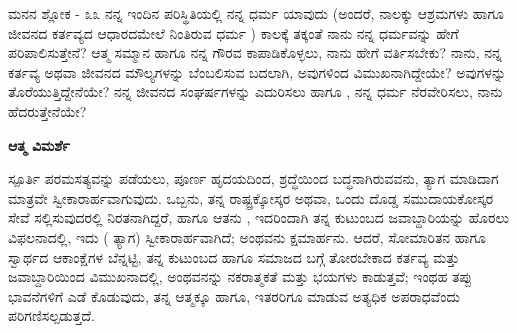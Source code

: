 \begin{mananam}{\mananamfont ಮನನ ಶ್ಲೋಕ - ೩೩}
\footnotesize \mananamtext ನನ್ನ ಇಂದಿನ ಪರಿಸ್ಥಿತಿಯಲ್ಲಿ ನನ್ನ ಧರ್ಮ ಯಾವುದು (ಅಂದರೆ, ನಾಲಕ್ಕು ಆಶ್ರಮಗಳು ಹಾಗೂ ಜೀವನದ ಕರ್ತವ್ಯದ ಆಧಾರದಮೇಲೆ ನಿಂತಿರುವ ಧರ್ಮ ) ಕಾಲಕ್ಕೆ ತಕ್ಕಂತೆ ನಾನು ನನ್ನ ಧರ್ಮವನ್ನು ಹೇಗೆ ಪರಿಪಾಲಿಸುತ್ತೇನೆ? ಆತ್ಮ ಸಮ್ಮಾನ ಹಾಗೂ ನನ್ನ ಗೌರವ ಕಾಪಾಡಿಕೊಳ್ಳಲು, ನಾನು ಹೇಗೆ ವರ್ತಿಸಬೇಕು? ನಾನು, ನನ್ನ ಕರ್ತವ್ಯ ಅಥವಾ ಜೀವನದ ಮೌಲ್ಯಗಳನ್ನು ಬೆಂಬಲಿಸುವ ಬದಲಾಗಿ, ಅವುಗಳಿಂದ ವಿಮುಖನಾಗಿದ್ದೇಯೇ? ಅವುಗಳನ್ನು ತೊರೆಯುತ್ತಿದ್ದೇನೆಯೇ? ನನ್ನ ಜೀವನದ ಸಂಘರ್ಷಗಳನ್ನು ಎದುರಿಸಲು ಹಾಗೂ , ನನ್ನ ಧರ್ಮ ನೆರವೇರಿಸಲು, ನಾನು ಹೆದರುತ್ತೇನೆಯೇ?
\end{mananam}
\WritingHand\enspace\textbf{ಆತ್ಮ ವಿಮರ್ಶೆ}
\begin{inspiration}{\mananamfont ಸ್ಪೂರ್ತಿ}
\footnotesize \mananamtext ಪರಮಸತ್ಯವನ್ನು ಪಡೆಯಲು, ಪೂರ್ಣ ಹೃದಯದಿಂದ, ಶ್ರದ್ಧೆಯಿಂದ ಬದ್ಧನಾಗಿರುವವನು, ತ್ಯಾಗ ಮಾಡಿದಾಗ ಮಾತ್ರವೇ ಸ್ವೀಕಾರಾರ್ಹವಾಗುವುದು. ಒಬ್ಬನು, ತನ್ನ ರಾಷ್ಟ್ರಕ್ಕೋಸ್ಕರ ಅಥವಾ, ಒಂದು ದೊಡ್ಡ ಸಮುದಾಯಕೋಸ್ಕರ ಸೇವೆ ಸಲ್ಲಿಸುವುದರಲ್ಲಿ ನಿರತನಾಗಿದ್ದರೆ, ಹಾಗೂ ಆತನು , ಇದರಿಂದಾಗಿ ತನ್ನ ಕುಟುಂಬದ ಜವಾಬ್ದಾರಿಯನ್ನು ಹೊರಲು ವಿಫಲನಾದಲ್ಲಿ, ಇದು ( ತ್ಯಾಗ) ಸ್ವೀಕಾರಾರ್ಹವಾಗಿದೆ; ಅಂಥವನು ಕ್ಷಮಾರ್ಹನು. ಆದರೆ, ಸೋಮಾರಿತನ ಹಾಗೂ ಸ್ವಾರ್ಥದ ಆಕಾಂಕ್ಷೆಗಳ ಬೆನ್ನಟ್ಟಿ, ತನ್ನ ಕುಟುಂಬದ ಹಾಗೂ ಸಮಾಜದ ಬಗ್ಗೆ ತೋರಬೇಕಾದ ಕರ್ತವ್ಯ  ಮತ್ತು ಜವಾಬ್ದಾರಿಯಿಂದ ವಿಮುಖನಾದಲ್ಲಿ, ಅಂಥವನನ್ನು ನಕರಾತ್ಮಕತೆ ಮತ್ತು ಭಯಗಳು ಕಾಡುತ್ತವೆ; ಇಂಥಹ ತಪ್ಪು ಭಾವನೆಗಳಿಗೆ ಎಡೆ ಕೊಡುವುದು, ತನ್ನ ಆತ್ಮಕ್ಕೂ ಹಾಗೂ, ಇತರರಿಗೂ ಮಾಡುವ ಅತ್ಯಧಿಕ ಅಪರಾಧವೆಂದು ಪರಿಗಣಿಸಲ್ಪಡುತ್ತದೆ. 
\end{inspiration}
\newpage


